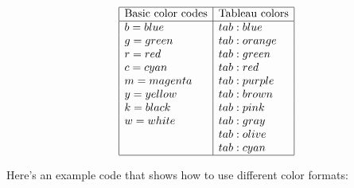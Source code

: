 \documentclass[11pt]{article}
\begin{document}
$$\begin{array}{|l|l|}
\hline
  \text{Basic color codes} & \text{Tableau colors}\\
\hline
b = blue & tab:blue \\
g = green & tab:orange \\
r = red & tab:green \\
c = cyan & tab:red \\
m = magenta & tab:purple \\
y = yellow & tab:brown \\
k = black & tab:pink \\
w = white & tab:gray \\
& tab:olive \\
& tab:cyan \\
\hline
\end{array}
$$

Here's an example code that shows how to use different color formats:
\end{document}
